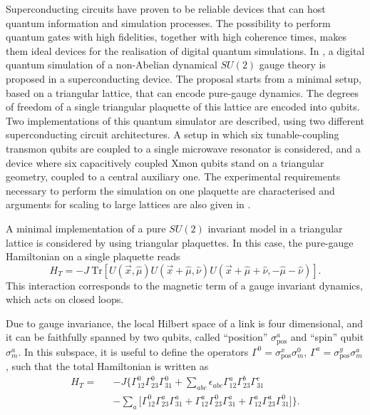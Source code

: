 \documentclass[epj,final]{svjour}
\begin{document}
Superconducting circuits have proven to be reliable devices that can host quantum information and simulation processes. The possibility to perform quantum gates with high fidelities, together with high coherence times, makes them ideal devices for the realisation of digital quantum simulations. In \cite{mezzacapo2015non}, a digital quantum simulation of a non-Abelian dynamical $SU(2)$ gauge theory is proposed in a superconducting device. The proposal starts from a minimal setup, based on a triangular lattice, that can encode pure-gauge dynamics. The degrees of freedom of a single triangular plaquette of this lattice are encoded into qubits. Two implementations of this quantum simulator are described, using two different superconducting circuit architectures. A setup in which six tunable-coupling transmon qubits are coupled to a single microwave resonator is considered, and a device where six capacitively coupled Xmon qubits stand on a triangular geometry, coupled to a central auxiliary one. The experimental requirements necessary to perform the simulation on one plaquette are characterised and arguments for scaling to large lattices are also given in \cite{mezzacapo2015non}.

A minimal implementation of a pure $SU(2)$ invariant model in a triangular lattice is considered by using triangular plaquettes. In this case, the pure-gauge Hamiltonian on a single plaquette reads 
\begin{equation}
H_T=-J~\text{Tr}\left[U(\vec{x},\hat{\mu})U(\vec{x}+\hat{\mu},\hat{\nu})U(\vec{x}+\hat{\mu}+\hat{\nu},-\hat{\mu}-\hat{\nu})\right].
\end{equation}
This interaction corresponds to the magnetic term of a gauge invariant dynamics, which acts on closed loops.

Due to gauge invariance, the local Hilbert space of a link is four dimensional, and it can be faithfully spanned by two qubits, called ``position'' $\sigma^{a}_{\textrm{pos}}$ and ``spin'' qubit $\sigma^{a}_{m}$. In this subspace, it is useful to define the operators $\Gamma^{0} = \sigma^{x}_{\textrm{pos}} \sigma^{0}_{m}$, $\Gamma^{a} =\sigma^{y}_{\textrm{pos}} \sigma^{a}_{m}$, such that the total Hamiltonian is written as
\begin{eqnarray}
\label{HG}
H_{T}=&&-J\Big\{ \Gamma^0_{12}\Gamma^0_{23}\Gamma^0_{31}+ \sum_{abc}\epsilon_{abc}\Gamma^a_{12}\Gamma^b_{23}\Gamma^c_{31} \\
&&-\sum_{a}\Big[\Gamma^0_{12}\Gamma^a_{23}\Gamma^a_{31} + \Gamma^a_{12}\Gamma^0_{23}\Gamma^a_{31}+\Gamma^a_{12}\Gamma^a_{23}\Gamma^0_{31}\Big] \Big\} \nonumber.
\end{eqnarray}
\end{document}
